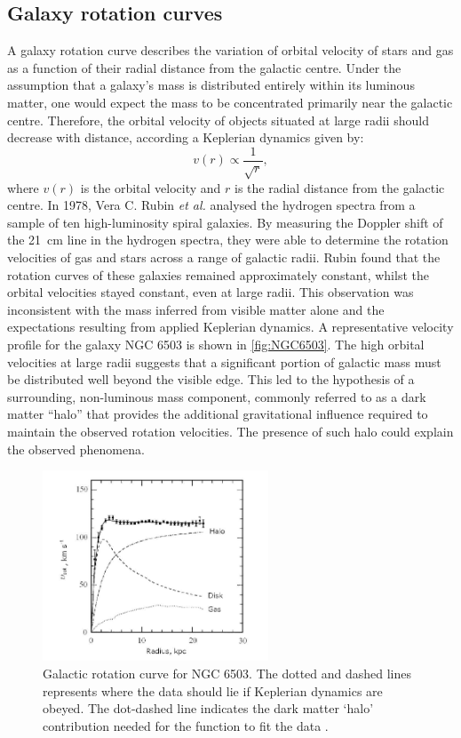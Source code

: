\subsection{Galaxy rotation curves}\label{sec:DMOverview/RotationCurves}
A galaxy rotation curve describes the variation of orbital velocity of stars and gas as a function of their radial distance from the galactic centre. Under the assumption that a galaxy's mass is distributed entirely within its luminous matter, one would expect the mass to be concentrated primarily near the galactic centre. Therefore, the orbital velocity of objects situated at large radii should decrease with distance, according a Keplerian dynamics given by:
\begin{equation}
v(r) \propto \frac{1}{\sqrt{r}},
\end{equation}
where $v(r)$ is the orbital velocity and $r$ is the radial distance from the galactic centre.
In 1978, Vera C. Rubin \textit{et al.}\cite{Rubin} analysed the hydrogen spectra from a sample of ten high-luminosity spiral galaxies. By measuring the Doppler shift of the 21~cm line in the hydrogen spectra, they were able to determine the rotation velocities of gas and stars across a range of galactic radii. Rubin found that the rotation curves of these galaxies remained approximately constant, whilst the orbital velocities stayed constant, even at large radii. This observation was inconsistent with the mass inferred from visible matter alone and the expectations resulting from applied Keplerian dynamics.
A representative velocity profile for the galaxy NGC 6503 is shown in \autoref{fig:NGC6503}. The high orbital velocities at large radii suggests that a significant portion of galactic mass must be distributed well beyond the visible edge. This led to the hypothesis of a surrounding, non-luminous mass component, commonly referred to as a dark matter ``halo'' that provides the additional gravitational influence required to maintain the observed rotation velocities. The presence of such halo could explain the observed phenomena.
\begin{figure}[ht]
	\centering
	\includegraphics[width = 0.6\textwidth]{figures/DMOverview/NGC_6503.png}
	\caption[Galactic rotation curve for NGC 6503.]{Galactic rotation curve for NGC 6503. The dotted and dashed lines represents where the data should lie if Keplerian dynamics are obeyed. The dot-dashed line indicates the dark matter `halo' contribution needed for the function to fit the data \cite{Freese2009}.}
	\label{fig:NGC6503}
\end{figure}
